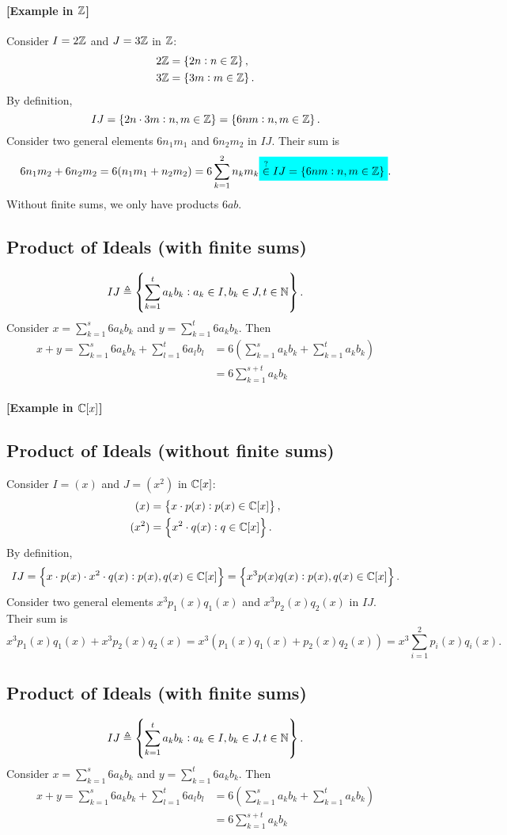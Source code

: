 \documentclass[11pt,openany]{article}
\begin{document}
\paragraph{[Example in $\mathbb{Z}$]}

Consider $I=2\mathbb{Z}$ and $J=3\mathbb{Z}$ in $\mathbb{Z}$: \begin{align*}
2\mathbb{Z}&=\set{2n:n\in\mathbb{Z}},\\
3\mathbb{Z}&=\set{3m:m\in\mathbb{Z}}.
\end{align*} By definition, \[
IJ=\set{2n\cdot 3m:n,m\in\mathbb{Z}}=\set{6nm:n,m\in\mathbb{Z}}.
\] Consider two general elements $6n_1m_1$ and $6n_2m_2$ in $IJ$.
Their sum is \[
6n_1m_2+6n_2m_2=6(n_1m_1+n_2m_2)=6\sum_{k=1}^{2}n_km_k\mathcolorbox{-red}{\overset{?}{\in}IJ=\set{6nm:n,m\in\Z}}.
\] Without finite sums, we only have products $6ab$.
\subsection*{Product of Ideals (with finite sums)}
\[
IJ\triangleq\set{\sum_{k=1}^ta_kb_k:a_k\in I,b_k\in J,t\in\mathbb{N}}.
\] Consider $x=\sum_{k=1}^s6a_kb_k$ and $y=\sum_{k=1}^t6a_kb_k$. Then \begin{align*}
x+y=\sum_{k=1}^s6a_kb_k+\sum_{l=1}^t6a_lb_l&=6\left(\sum_{k=1}^sa_kb_k+\sum_{k=1}^ta_kb_k\right)
\\&=6\sum_{k=1}^{s+t}a_kb_k
\end{align*}
\newpage
\paragraph{[Example in $\mathbb{C}[x]$]}
\subsection*{Product of Ideals (without finite sums)}
Consider $I=(x)$ and $J=(x^2)$ in $\mathbb{C}[x]$: \begin{align*}
(x)&=\set{x\cdot p(x):p(x)\in\mathbb{C}[x]},\\
(x^2)&=\set{x^2\cdot q(x):q\in\mathbb{C}[x]}.
\end{align*} By definition, \[
IJ=\set{x\cdot p(x)\cdot x^2\cdot q(x):p(x),q(x)\in\mathbb{C}[x]}=\set{x^3p(x)q(x):p(x),q(x)\in\mathbb{C}[x]}.
\] Consider two general elements $x^3p_1(x)q_1(x)$ and $x^3p_2(x)q_2(x)$ in $IJ$.
Their sum is \[
x^3p_1(x)q_1(x)+x^3p_2(x)q_2(x)=x^3(p_1(x)q_1(x)+p_2(x)q_2(x))=x^3\sum_{i=1}^2p_i(x)q_i(x).
\]
\subsection*{Product of Ideals (with finite sums)}
\[
IJ\triangleq\set{\sum_{k=1}^ta_kb_k:a_k\in I,b_k\in J,t\in\mathbb{N}}.
\] Consider $x=\sum_{k=1}^s6a_kb_k$ and $y=\sum_{k=1}^t6a_kb_k$. Then \begin{align*}
x+y=\sum_{k=1}^s6a_kb_k+\sum_{l=1}^t6a_lb_l&=6\left(\sum_{k=1}^sa_kb_k+\sum_{k=1}^ta_kb_k\right)
\\&=6\sum_{k=1}^{s+t}a_kb_k
\end{align*}
\end{document}
